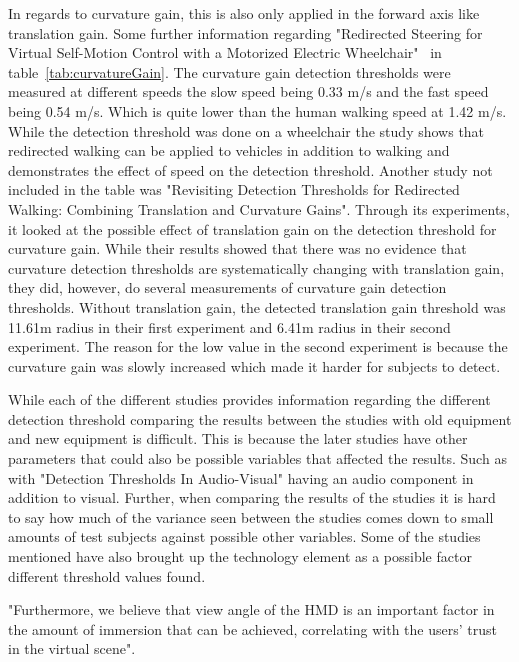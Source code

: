 \noindent
In regards to curvature gain, this is also only applied in the forward axis like translation gain. Some further information regarding "Redirected Steering for Virtual Self-Motion Control with a Motorized Electric Wheelchair"~\cite{neira2012redirected} in table~\ref{tab:curvatureGain}. The curvature gain detection thresholds were measured at different speeds the slow speed being 0.33 m/s and the fast speed being 0.54 m/s. Which is quite lower than the human walking speed at 1.42 m/s. While the detection threshold was done on a wheelchair the study shows that redirected walking can be applied to vehicles in addition to walking and demonstrates the effect of speed on the detection threshold. Another study not included in the table was "Revisiting Detection Thresholds for Redirected Walking: Combining Translation and Curvature Gains"\cite{grechkin2016revisiting}. Through its experiments, it looked at the possible effect of translation gain on the detection threshold for curvature gain. While their results showed that there was no evidence that curvature detection thresholds are systematically changing with translation gain, they did, however, do several measurements of curvature gain detection thresholds. Without translation gain, the detected translation gain threshold was 11.61m radius in their first experiment and 6.41m radius in their second experiment. The reason for the low value in the second experiment is because the curvature gain was slowly increased which made it harder for subjects to detect.
\bigskip

\noindent
While each of the different studies provides information regarding the different detection threshold comparing the results between the studies with old equipment and new equipment is difficult. This is because the later studies have other parameters that could also be possible variables that affected the results. Such as with "Detection Thresholds In Audio-Visual" having an audio component in addition to visual. Further, when comparing the results of the studies it is hard to say how much of the variance seen between the studies comes down to small amounts of test subjects against possible other variables. Some of the studies mentioned have also brought up the technology element as a possible factor different threshold values found.

"Furthermore, we believe that view angle of the HMD is an important factor in the amount of immersion that can be achieved, correlating with the users’ trust in the virtual scene"\cite{engel2008psychophysically}.

